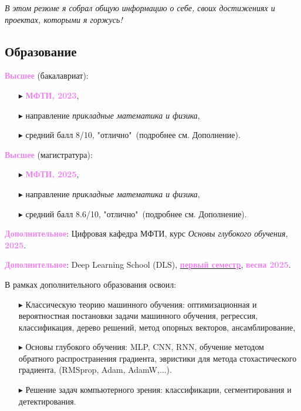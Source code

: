 \documentclass[a4paper,12pt]{article}
\begin{document}
	\vspace{0.5cm}
	
	\begin{tcolorbox}[myblock]
		\selectfont\fontsize{15}{15}\textit{В этом резюме я собрал общую информацию о себе, своих достижениях и проектах, которыми я горжусь!}
	\end{tcolorbox}
	\vspace{5pt}
	\subsection*{Образование}
	\textcolor{violet}{\textbf{Высшее}} (бакалавриат): 
	\begin{itemize}
		\item[$\blacktriangleright$] \textcolor{violet}{\textbf{МФТИ, 2023}},
		\item[$\blacktriangleright$] направление \textit{прикладные математика и физика}, 
		\item[$\blacktriangleright$] средний балл 8/10, "отлично"\ (подробнее см. Дополнение).
	\end{itemize}
	
	\textcolor{violet}{\textbf{Высшее}} (магистратура):
	\begin{itemize}
		\item[$\blacktriangleright$] \textcolor{violet}{\textbf{МФТИ, 2025}},
		\item[$\blacktriangleright$] направление \textit{прикладные математика и физика}, 
		\item[$\blacktriangleright$] средний балл 8.6/10, "отлично"\ (подробнее см. Дополнение).
	\end{itemize}
	
	\textcolor{violet}{\textbf{Дополнительное}}: Цифровая кафедра МФТИ, курс \textit{Основы глубокого обучения}, \textcolor{violet}{\textbf{2025}}.
	
	\textcolor{violet}{\textbf{Дополнительное}}: Deep Learning School (DLS), \href{https://stepik.org/course/230362/syllabus}{\textcolor{violet}{\textbf{первый семестр}}}, \textcolor{violet}{\textbf{весна 2025}}.
	
	В рамках дополнительного образования освоил: 
	\begin{itemize}
		\item[$\blacktriangleright$] Классическую теорию машинного обучения: оптимизационная и вероятностная постановки задачи машинного обучения, регрессия, классификация, дерево решений, метод опорных векторов, ансамблирование,
		\item[$\blacktriangleright$] Основы глубокого обучения: MLP, CNN, RNN, обучение методом обратного распространения градиента, эвристики для метода стохастического градиента, (RMSprop, Adam, AdamW,...).
		\item[$\blacktriangleright$] Решение задач компьютерного зрения: классификации, сегментирования и детектирования.
	\end{itemize}
	
\end{document}
